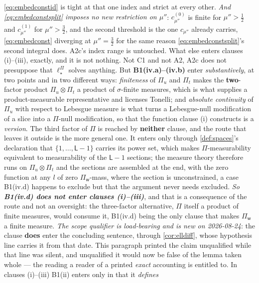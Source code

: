\begin{lemma}
\eqref{eq:embedconstid} is tight at that one index and strict at every other.
\emph{And \eqref{eq:embedconstsplit} imposes no new restriction on $\mu''$}: $c^{(0)}_{\mu''}$ is finite
for $\mu''>\tfrac12$ and $c^{(1)}_{\mu''}$ for $\mu''>\tfrac32$, and the second threshold is the one
$c_{\mu''}$ already carries, \eqref{eq:embedconst} diverging at $\mu''=\tfrac32$ for the same reason
\eqref{eq:embedconstsplit}'s second integral does. A2c's index range is untouched.
What else enters clauses \textup{(i)}--\textup{(iii)}, exactly, and it is not nothing. Not C1 and
not A2, A2c does not presuppose that $\ell^\Pi_\star$ solves anything. But \textbf{B1(iv.a)--(iv.b)}
enter \emph{substantively}, at two points and in two different ways: \emph{finiteness} of $\Pi_u$ and
$\Pi_t$ makes the \textbf{two}-factor product $\Pi_u\otimes\Pi_t$ a product of $\sigma$-finite measures,
which is what supplies a product-measurable
representative and licenses Tonelli; and \emph{absolute continuity} of $\Pi_u$ with respect to Lebesgue
measure is what turns a Lebesgue-null modification of a slice into a $\Pi$-null modification, so that the
function clause \textup{(i)} constructs is a \emph{version}.
The third factor of $\Pi$ is reached by \textbf{neither} clause, and the route that leaves it
outside is the more general one. It enters only through \cref{def:spaces}'s declaration that
$\{1,\dots,\mathsf L-1\}$ carries its power set, which makes $\Pi$-measurability equivalent to
measurability of the $\mathsf L-1$ sections; the measure theory therefore runs on
$\Pi_u\otimes\Pi_t$ and the sections are assembled at the end, with the zero function at any $l$ of
zero $\Pi_{\mathsf w}$-mass, where the section is unconstrained, a case B1(iv.d) happens to exclude but
that the argument never needs excluded. \emph{So \textbf{B1(iv.d) does not enter clauses
\textup{(i)}--\textup{(iii)}}}, and that is a
consequence of the route and not an oversight: the three-factor alternative, $\Pi$ itself a product of
finite measures, would consume it, B1(iv.d) being the only clause that makes $\Pi_{\mathsf w}$ a
finite measure. \emph{The scope qualifier is load-bearing and is new on 2026-08-24}: the clause
\textbf{does} enter the concluding sentence, through \cref{cor:elldiff}, whose hypothesis line carries
it from that date. This paragraph printed the claim unqualified while that line was silent, and
unqualified it would now be false of the lemma taken whole --- the reading a reader of a printed
\emph{exact} accounting is entitled to.
In clauses \textup{(i)}--\textup{(iii)} B1(ii) enters only in that it \emph{defines}

\end{lemma}
